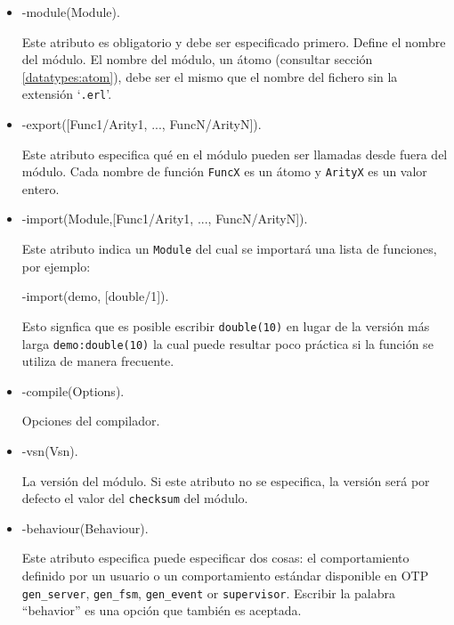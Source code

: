 \begin{itemize}
	\item \begin{erlangim}
	-module(Module).
	\end{erlangim}
	Este atributo es obligatorio y debe ser especificado primero. Define el nombre del m\'odulo. El nombre del m\'odulo, un \'atomo (consultar secci\'on \ref{datatypes:atom}), debe ser el mismo que el nombre del fichero sin la extensi\'on `\texttt{.erl}'.

	\item \begin{erlangim}
	-export([Func1/Arity1, ..., FuncN/ArityN]).
	\end{erlangim}
	Este atributo especifica qu\'e en el m\'odulo pueden ser llamadas desde fuera del m\'odulo. Cada nombre de funci\'on \texttt{FuncX} es un \'atomo y \texttt{ArityX} es un valor entero.

	\item \begin{erlangim}
	-import(Module,[Func1/Arity1, ..., FuncN/ArityN]).
	\end{erlangim}
    Este atributo indica un \texttt{Module} del cual se importar\'a una lista de funciones, por ejemplo:  
    \begin{erlangim}
	-import(demo, [double/1]).
	\end{erlangim}
    Esto signfica que es posible escribir \texttt{double(10)} en lugar de la versi\'on m\'as larga \texttt{demo:double(10)} la cual puede resultar poco pr\'actica si la funci\'on se utiliza de manera frecuente.

	\item \begin{erlangim}
	-compile(Options).
	\end{erlangim}
	Opciones del compilador.

	\item \begin{erlangim}
	-vsn(Vsn).
	\end{erlangim}
    La versi\'on del m\'odulo. Si este atributo no se especifica, la versi\'on ser\'a por defecto el valor del \texttt{checksum} del m\'odulo.

	\item \begin{erlangim}
	-behaviour(Behaviour).
	\end{erlangim}
    Este atributo especifica puede especificar dos cosas: el comportamiento definido por un usuario o un comportamiento est\'andar disponible en OTP \texttt{gen\_server}, \texttt{gen\_fsm}, \texttt{gen\_event} or
        \texttt{supervisor}. Escribir la palabra ``behavior'' es una opci\'on que tambi\'en es aceptada.

\end{itemize}


